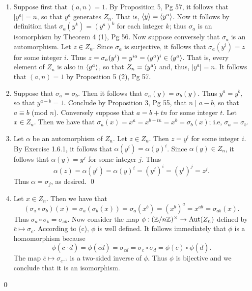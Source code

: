 \begin{enumerate}
      \begin{enumerate}
         \item Suppose first that $(a, n) = 1$. By Proposition 5, Pg 57, it 
               follows that $|y^a| = n$, so that $y^a$ generates $Z_n$. That is, 
               $\langle y \rangle =\langle y^a \rangle$. Now it follows by definition that
               $\sigma_a(y^k) = (y^{a})^k$ for each integer $k$; thus
               $\sigma_a$ is an isomorphism by Theorem 4 (1), Pg 56. Now suppose
               conversely that $\sigma_a$ is an automorphism. Let $z \in Z_n$. 
               Since $\sigma_a$ is surjective, it follows that
               $\sigma_a(y^i) = z$ for some integer $i$. Thus
               $z = \sigma_a(y^i) = y^{ia} = ({y^a})^i \in \langle y^a \rangle$. That is,
               every element of $Z_n$ is also in $\langle y^a \rangle$, so that
               $Z_n = \langle y^a \rangle$ and, thus, $|y^a| = n$. It follows that
               $(a, n) = 1$ by Proposition 5 (2), Pg 57.
         \item Suppose that $\sigma_a = \sigma_b$. Then it follows that
               $\sigma_a(y) = \sigma_b(y)$. Thus $y^a = y^b$, so that
               $y^{a-b} = 1$. Conclude by Proposition 3, Pg 55, that
               $n \mid a - b$, so that $a \equiv b$ (mod $n$). Conversely
               suppose that $a = b + tn$ for some integer $t$. Let $x \in Z_n$.
               Then we have that
               $\sigma_a(x) = x^a = x^{b+tn} = x^b = \sigma_b(x)$; i.e,
               $\sigma_a = \sigma_b$.
         \item Let $\alpha$ be an automorphism of $Z_n$. Let $z \in Z_n$. Then
               $z = y^i$ for some integer $i$. By Exercise 1.6.1, it follows
               that $\alpha(y^i) = \alpha(y)^i$. Since $\alpha(y) \in Z_n$, it
               follows that $\alpha(y) = y^j$ for some integer $j$. Thus
               $$\alpha(z) = \alpha(y^i) = \alpha(y)^i = (y^{j})^i = (y^{i})^j
                           = z^j.$$
               Thus $\alpha = \sigma_j$, as desired. \qed
         \item Let $x \in Z_n$. Then we have that
               $$(\sigma_a\circ\sigma_b)(x) = \sigma_a(\sigma_b(x)) =
                  \sigma_a(x^b) = (x^b)^a = x^{ab} = \sigma_{ab}(x).$$
               Thus $\sigma_a \circ \sigma_b = \sigma_{ab}$. Now consider the
               map $\phi : (\mathbb{Z}/n\mathbb{Z})^\times \rightarrow \text{Aut}(Z_n)$ defined 
               by $\overline{c} \mapsto \sigma_c$. According to (c), $\phi$ is 
               well defined. It follows immediately that $\phi$ is a homomorphism 
               because 
               $$\phi(\overline{c}\cdot\overline{d}) = \phi(\overline{cd}) = 
                 \sigma_{cd} = \sigma_c\circ\sigma_d =
                 \phi(\overline{c})\circ\phi(\overline{d}).$$
               The map $\overline{c} \mapsto \sigma_{c^{-1}}$ is a two-sided 
               inverse of $\phi$. Thus $\phi$ is bijective and we conclude that 
               it is an isomorphism.
      \end{enumerate} \qed
\end{enumerate}
